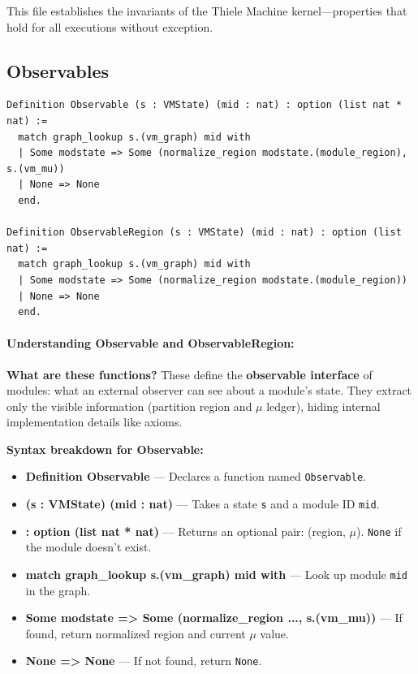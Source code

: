 This file establishes the invariants of the Thiele Machine kernel—properties that hold for all executions without exception.

\subsection{Observables}

\begin{lstlisting}
Definition Observable (s : VMState) (mid : nat) : option (list nat * nat) :=
  match graph_lookup s.(vm_graph) mid with
  | Some modstate => Some (normalize_region modstate.(module_region), s.(vm_mu))
  | None => None
  end.

Definition ObservableRegion (s : VMState) (mid : nat) : option (list nat) :=
  match graph_lookup s.(vm_graph) mid with
  | Some modstate => Some (normalize_region modstate.(module_region))
  | None => None
  end.
\end{lstlisting}
\paragraph{Understanding Observable and ObservableRegion:}

\textbf{What are these functions?} These define the \textbf{observable interface} of modules: what an external observer can see about a module's state. They extract only the visible information (partition region and $\mu$ ledger), hiding internal implementation details like axioms.

\textbf{Syntax breakdown for Observable:}
\begin{itemize}
    \item \textbf{Definition Observable} — Declares a function named \texttt{Observable}.
    \item \textbf{(s : VMState) (mid : nat)} — Takes a state \texttt{s} and a module ID \texttt{mid}.
    \item \textbf{: option (list nat * nat)} — Returns an optional pair: (region, $\mu$). \texttt{None} if the module doesn't exist.
    \item \textbf{match graph\_lookup s.(vm\_graph) mid with} — Look up module \texttt{mid} in the graph.
    \item \textbf{Some modstate => Some (normalize\_region ..., s.(vm\_mu))} — If found, return normalized region and current $\mu$ value.
    \item \textbf{None => None} — If not found, return \texttt{None}.
\end{itemize}

